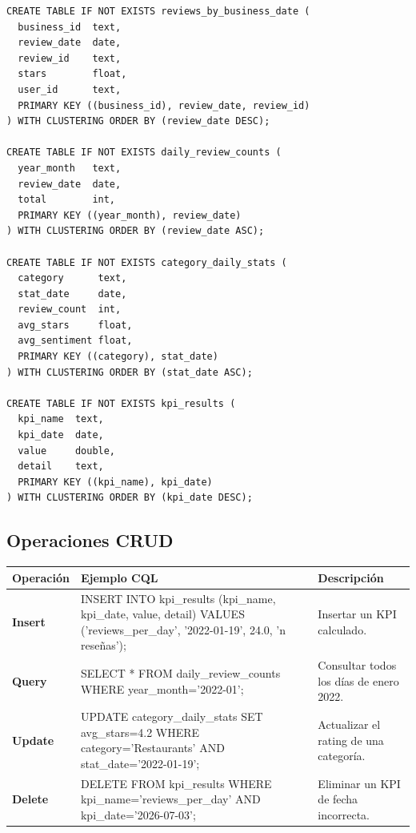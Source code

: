 \documentclass[12pt,a4paper]{article}
\begin{document}
\begin{lstlisting}[language=CQL]
CREATE TABLE IF NOT EXISTS reviews_by_business_date (
  business_id  text,
  review_date  date,
  review_id    text,
  stars        float,
  user_id      text,
  PRIMARY KEY ((business_id), review_date, review_id)
) WITH CLUSTERING ORDER BY (review_date DESC);

CREATE TABLE IF NOT EXISTS daily_review_counts (
  year_month   text,
  review_date  date,
  total        int,
  PRIMARY KEY ((year_month), review_date)
) WITH CLUSTERING ORDER BY (review_date ASC);

CREATE TABLE IF NOT EXISTS category_daily_stats (
  category      text,
  stat_date     date,
  review_count  int,
  avg_stars     float,
  avg_sentiment float,
  PRIMARY KEY ((category), stat_date)
) WITH CLUSTERING ORDER BY (stat_date ASC);

CREATE TABLE IF NOT EXISTS kpi_results (
  kpi_name  text,
  kpi_date  date,
  value     double,
  detail    text,
  PRIMARY KEY ((kpi_name), kpi_date)
) WITH CLUSTERING ORDER BY (kpi_date DESC);
\end{lstlisting}

\subsection{Operaciones CRUD}

\begin{longtable}{>{\bfseries}p{2.5cm} >{\ttfamily\small\raggedright\arraybackslash}p{7cm} >{\raggedright\arraybackslash}p{4cm}}
\toprule
\normalfont\textbf{Operación} & \normalfont\textbf{Ejemplo CQL} & \normalfont\textbf{Descripción} \\
\midrule
Insert &
INSERT INTO kpi\_results (kpi\_name, kpi\_date, value, detail) VALUES ('reviews\_per\_day', '2022-01-19', 24.0, 'n reseñas'); &
Insertar un KPI calculado. \\[0.3em]

Query &
SELECT * FROM daily\_review\_counts WHERE year\_month='2022-01'; &
Consultar todos los días de enero 2022. \\[0.3em]

Update &
UPDATE category\_daily\_stats SET avg\_stars=4.2 WHERE category='Restaurants' AND stat\_date='2022-01-19'; &
Actualizar el rating de una categoría. \\[0.3em]

Delete &
DELETE FROM kpi\_results WHERE kpi\_name='reviews\_per\_day' AND kpi\_date='2026-07-03'; &
Eliminar un KPI de fecha incorrecta. \\
\bottomrule
\end{longtable}
\end{document}
